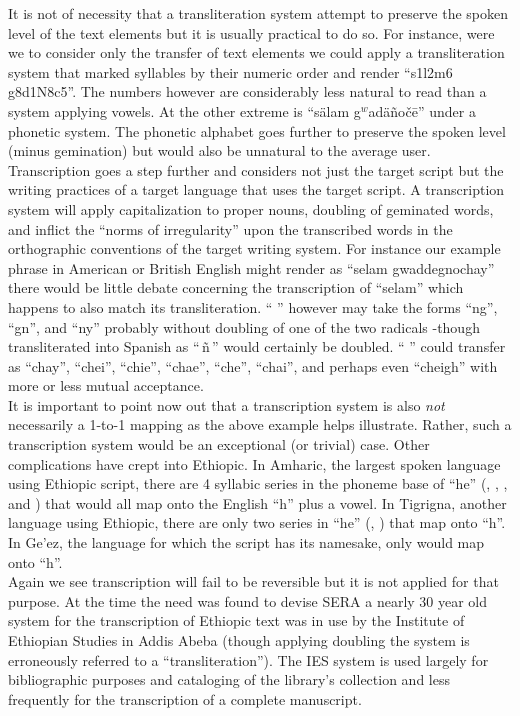 It is not of necessity that a transliteration system attempt to preserve the
spoken level of the text elements but it is usually practical to do so.  For
instance, were we to consider only the transfer of text elements we could
apply a transliteration system that marked syllables by their numeric order and
render ``s1l2m6 g8d1N8c5''.
The numbers however are considerably less natural to read than a system
applying vowels.  At the other extreme is ``s\"{a}lam g$^w$ad\"{a}\~{n}o\v{c}\={e}''
under a phonetic system.  The phonetic alphabet goes further to preserve the
spoken level (minus gemination) but would also be unnatural to the average user.\\

Transcription goes a step further and considers not just the target script but
the writing practices of a target language that uses the target script.  A
transcription system will apply capitalization to proper nouns, doubling of
geminated words, and inflict the ``norms of irregularity'' upon the transcribed
words in the orthographic conventions of the target writing system.  For 
instance our example phrase in American or British English might render as
``selam gwaddegnochay'' there would be little debate concerning the transcription
of ``selam'' which happens to also match its transliteration.  ``\,{\NoG}\,'' however may
take the forms ``ng'', ``gn'', and ``ny'' probably without doubling of one of the two
radicals -though transliterated into Spanish as ``\,\~{n}\,'' would certainly be doubled.
``\,{\cEG}\,'' could transfer as ``chay'', ``chei'', ``chie'', ``chae'', ``che'', ``chai'', and
perhaps even ``cheigh'' with more or less mutual acceptance.\\

It is important to point now out that a transcription system is also \emph{not} necessarily
a 1-to-1 mapping as the above example helps illustrate.  Rather, such a transcription
system would be an exceptional (or trivial)  case.  Other complications have crept
into Ethiopic.  In Amharic, the largest spoken language using Ethiopic script, there
are 4 syllabic series in the phoneme base of ``he'' ({\heG}, {\HeG}, {\hheG}, and {\KeG}) that would all map
onto the English ``h'' plus a vowel.  In Tigrigna, another language using Ethiopic, there
are only two series in ``he'' ({\heG}, {\hheG}) that map onto ``h''.  In Ge'ez, the
language for which the script has its namesake, only {\heG} would map onto ``h''.\\

Again we see transcription will fail to be reversible but it is not applied
for that purpose.  At the time the need was found to devise SERA a nearly 30
year old system for the transcription of Ethiopic text was in use by the
Institute of Ethiopian Studies in Addis Abeba (though applying doubling the
system is erroneously referred to a ``transliteration'').  The IES system is used
largely for bibliographic purposes and cataloging of the library's collection
and less frequently for the transcription of a complete manuscript.\\

